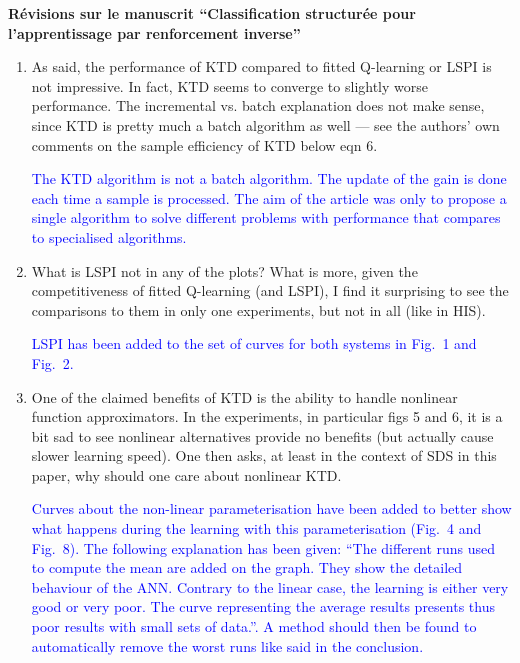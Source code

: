\documentclass[11pt, a4paper]{letter}
\begin{document}
\begin{letter}{\large \textbf{Révisions sur le manuscrit ``Classification structurée pour l'apprentissage par renforcement inverse''}}
\begin{enumerate}
 \textcolor{blue}{ The KTD algorithm is now explained Sec. III: `` The KTD algorithm is done in four steps: an \textit{initialisation} step, a \textit{prediction} step, a computational phase of \textit{statistics of interest} and finally a \textit{correction} step. [$\ldots$]''. The detail of each step is then given. As precised previously, a paragraph has also been added to explain the role of the different parameters. }


\item  As said, the performance of KTD compared to fitted Q-learning or
 LSPI is not impressive.  In fact, KTD seems to converge to slightly worse
 performance.  The incremental vs. batch explanation does not make sense,
 since KTD is pretty much a batch algorithm as well --- see the authors' own
 comments on the sample efficiency of KTD below eqn 6.

\textcolor{blue}{The KTD algorithm is not a batch algorithm. The
update of the gain is done each time a sample is processed. The aim
of the article was only to propose a single algorithm to solve
different problems with performance that compares to specialised
algorithms. }

\item  What is LSPI not in any of the plots?  What is more, given the
 competitiveness of fitted Q-learning (and LSPI), I find it surprising to
 see the comparisons to them in only one experiments, but not in all (like
 in HIS).

 \textcolor{blue}{LSPI has been added to the set of curves for both systems in Fig.~1 and Fig.~2.}

\item  One of the claimed benefits of KTD is the ability to handle
 nonlinear function approximators.  In the experiments, in particular figs 5
 and 6, it is a bit sad to see nonlinear alternatives provide no benefits
 (but actually cause slower learning speed).  One then asks, at least in the
 context of SDS in this paper, why should one care about nonlinear KTD.

\textcolor{blue}{ Curves about the non-linear parameterisation have
been added to better show what happens during the learning with this
parameterisation (Fig.~4 and Fig.~8). The following explanation has
been given: ``The different runs used to compute the mean are added
on the graph. They show the detailed behaviour of the ANN. Contrary
to the linear case, the learning is either very good or very poor.
The curve representing the average results presents thus poor
results with small sets of data.''. A method should then be found to
automatically remove the worst runs like said in the conclusion.}



\end{enumerate}
\end{letter}
\end{document}
